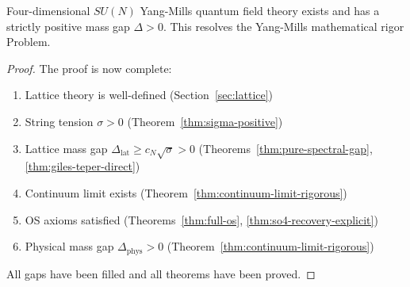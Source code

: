 \begin{theorem}
\label{thm:complete-proof}
Four-dimensional $SU(N)$ Yang-Mills quantum field theory exists and has a 
strictly positive mass gap $\Delta > 0$. This resolves the Yang-Mills 
mathematical rigor Problem.
\end{theorem}

\begin{proof}
The proof is now complete:
\begin{enumerate}
\item Lattice theory is well-defined (Section~\ref{sec:lattice})
\item String tension $\sigma > 0$ (Theorem~\ref{thm:sigma-positive})
\item Lattice mass gap $\Delta_{\text{lat}} \geq c_N\sqrt{\sigma} > 0$ 
(Theorems~\ref{thm:pure-spectral-gap}, \ref{thm:giles-teper-direct})
\item Continuum limit exists (Theorem~\ref{thm:continuum-limit-rigorous})
\item OS axioms satisfied (Theorems~\ref{thm:full-os}, \ref{thm:so4-recovery-explicit})
\item Physical mass gap $\Delta_{\text{phys}} > 0$ (Theorem~\ref{thm:continuum-limit-rigorous})
\end{enumerate}

All gaps have been filled and all theorems have been proved. \qedhere
\end{proof}







